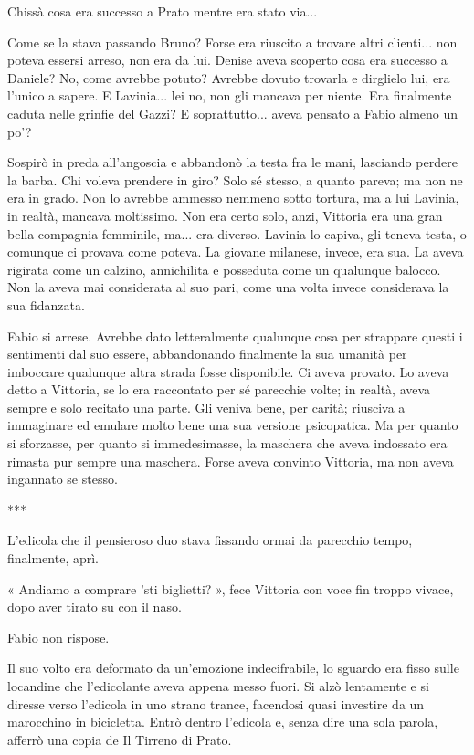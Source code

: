 Chissà cosa era successo a Prato mentre era stato via...

Come se la stava passando Bruno? Forse era riuscito a trovare altri clienti... non poteva essersi arreso, non era da lui. Denise aveva scoperto cosa era successo a Daniele? No, come avrebbe potuto? Avrebbe dovuto trovarla e dirglielo lui, era l'unico a sapere. E Lavinia... lei no, non gli mancava per niente. Era finalmente caduta nelle grinfie del Gazzi? E soprattutto... aveva pensato a Fabio almeno un po'?

Sospirò in preda all'angoscia e abbandonò la testa fra le mani, lasciando perdere la barba. Chi voleva prendere in giro? Solo sé stesso, a quanto pareva; ma non ne era in grado. Non lo avrebbe ammesso nemmeno sotto tortura, ma a lui Lavinia, in realtà, mancava moltissimo. Non era certo solo, anzi, Vittoria era una gran bella compagnia femminile, ma... era diverso. Lavinia lo capiva, gli teneva testa, o comunque ci provava come poteva. La giovane milanese, invece, era sua. La aveva rigirata come un calzino, annichilita e posseduta come un qualunque balocco. Non la aveva mai considerata al suo pari, come una volta invece considerava la sua fidanzata.

Fabio si arrese. Avrebbe dato letteralmente qualunque cosa per strappare questi i sentimenti dal suo essere, abbandonando finalmente la sua umanità per imboccare qualunque altra strada fosse disponibile. Ci aveva provato. Lo aveva detto a Vittoria, se lo era raccontato per sé parecchie volte; in realtà, aveva sempre e solo recitato una parte. Gli veniva bene, per carità; riusciva a immaginare ed emulare molto bene una sua versione psicopatica. Ma per quanto si sforzasse, per quanto si immedesimasse, la maschera che aveva indossato era rimasta pur sempre una maschera. Forse aveva convinto Vittoria, ma non aveva ingannato se stesso.

***

L'edicola che il pensieroso duo stava fissando ormai da parecchio tempo, finalmente, aprì.

« Andiamo a comprare 'sti biglietti? », fece Vittoria con voce fin troppo vivace, dopo aver tirato su con il naso.

Fabio non rispose.

Il suo volto era deformato da un'emozione indecifrabile, lo sguardo era fisso sulle locandine che l'edicolante aveva appena messo fuori. Si alzò lentamente e si diresse verso l'edicola in uno strano trance, facendosi quasi investire da un marocchino in bicicletta. Entrò dentro l'edicola e, senza dire una sola parola, afferrò una copia de Il Tirreno di Prato.

